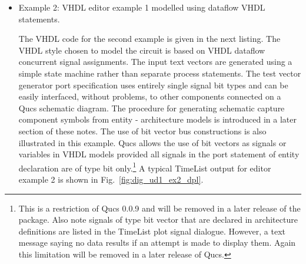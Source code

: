 \begin{itemize}
\item Example 2: VHDL editor example 1 modelled using dataflow VHDL statements.

The VHDL code for the second example is given in the next listing.
The VHDL style chosen to model the circuit is based on VHDL dataflow
concurrent signal assignments.  The input text vectors are generated
using a simple state machine rather than separate process statements.
The test vector generator port specification uses entirely single
signal bit types and can be easily interfaced, without problems, to
other components connected on a Qucs schematic diagram.  The procedure
for generating schematic capture component symbols from entity -
architecture models is introduced in a later section of these notes.
The use of bit vector bus constructions is also illustrated in this
example.  Qucs allows the use of bit vectors as signals or variables
in VHDL models provided all signals in the port statement of entity
declaration are of type bit only.\footnote{This is a restriction of
Qucs 0.0.9 and will be removed in a later release of the package. Also
note signals of type bit vector that are declared in architecture
definitions are listed in the TimeList plot signal dialogue. However,
a text message saying no data results if an attempt is made to display
them.  Again this limitation will be removed in a later release of
Qucs.}  A typical TimeList output for editor example 2 is shown in
Fig.~\ref{fig:dig_ud1_ex2_dpl}.


\end{itemize}
